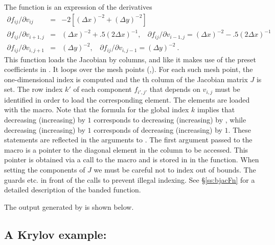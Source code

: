 The  function is an expression of the derivatives
\begin{eqnarray*}
\partial f_{ij} / \partial v_{ij} &=&
         -2 [(\Delta x)^{-2} + (\Delta y)^{-2}] \\
\partial f_{ij} / \partial v_{i+1,j} &=& (\Delta x)^{-2} 
                  + .5 (2 \Delta x)^{-1}, ~~~~
\partial f_{ij} / \partial v_{i-1,j}  =  (\Delta x)^{-2} 
                  - .5 (2 \Delta x)^{-1} \\
\partial f_{ij} / \partial v_{i,j+1} &=& (\Delta y)^{-2}, ~~~~
\partial f_{ij} / \partial v_{i,j-1}  =  (\Delta y)^{-2} ~. 
\end{eqnarray*}
This function loads the Jacobian by columns, and like  it
makes use of the preset coefficients in .
It loops over the mesh points (,). For each such mesh
point, the one-dimensional index  is computed
and the th column of the Jacobian matrix $J$ is set. 
The row index $k'$ of each component $f_{i',j'}$ that depends on
$v_{i,j}$ must be identified in order to load the corresponding element.
The elements are loaded with the  macro.
Note that the formula for the global index $k$ implies that decreasing 
(increasing)  by $1$ corresponds to decreasing (increasing) 
 by , while decreasing (increasing)  by $1$ 
corresponds of decreasing (increasing)  by $1$. 
These statements are reflected in the arguments to . 
The first argument passed to the  macro is a pointer to
the diagonal element in the column to be accessed. This pointer is obtained
via a call to the  macro and is stored in  in
the  function. When setting the components of $J$ we must be
careful not to index out of bounds. The guards  etc.
in front of the calls to  prevent illegal indexing.
See \S\ref{ss:bjacFn} for a detailed description of the banded 
function.

The output generated by  is shown below.



\subsection{A Krylov example: }\label{ss:cvkx}

